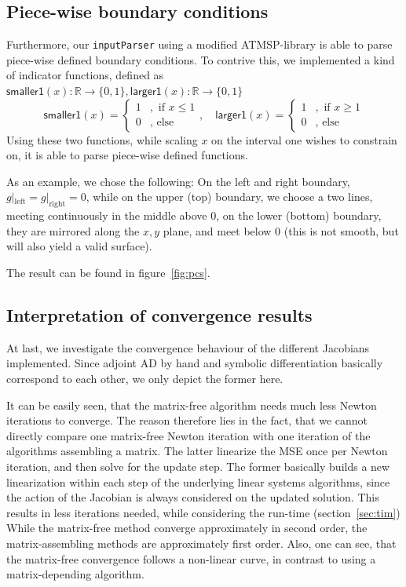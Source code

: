 \documentclass[11pt]{scrartcl}
\begin{document}
\subsection{Piece-wise boundary conditions}\label{sec:pcs}
Furthermore, our \texttt{inputParser} using a modified ATMSP-library is able to parse piece-wise defined boundary conditions.
To contrive this, we implemented a kind of indicator functions, defined as $\textsf{smaller1}(x): \mathbb{R} \to \{0,1\}, \textsf{larger1}(x): \mathbb{R} \to \{0,1\}$
\begin{equation}
	\textsf{smaller1}(x) = \begin{cases}
	1&, \text{ if } x \le 1 \\ 0&, \text{ else } 
	\end{cases}, \quad 	\textsf{larger1}(x) = \begin{cases}
	1&, \text{ if } x \ge 1 \\ 0&, \text{ else } 
	\end{cases} 
\end{equation}
Using these two functions, while scaling $x$ on the interval one wishes to constrain on, it is able to parse piece-wise defined functions. 

As an example, we chose the following: On the left and right boundary, $g|_{\text{left}}= g|_{\text{right}}=0$, while on the upper (top) boundary, we choose a two lines, meeting continuously in the middle above 0, on the lower (bottom) boundary, they are mirrored along the $x,y$ plane, and meet below 0 (this is not smooth, but will also yield a valid surface).

The result can be found in figure~\ref{fig:pcs}.


\newpage
\subsection{Interpretation of convergence results}
At last, we investigate the convergence behaviour of the different Jacobians implemented. Since adjoint AD by hand and symbolic differentiation basically correspond to each other, we only depict the former here. 

It can be easily seen, that the matrix-free algorithm needs much less Newton iterations to converge. The reason therefore lies in the fact, that we cannot directly compare one matrix-free Newton iteration with one iteration of the algorithms assembling a matrix. The latter linearize the MSE once per Newton iteration, and then solve for the update step. The former basically builds a new linearization within each step of the underlying linear systems algorithms, since the action of the Jacobian is always considered on the updated solution. This results in less iterations needed, while considering the run-time (section~\ref{sec:tim})
While the matrix-free method converge approximately in second order, the matrix-assembling methods are approximately first order. Also, one can see, that the matrix-free convergence follows a non-linear curve, in contrast to using a matrix-depending algorithm.
\end{document}
